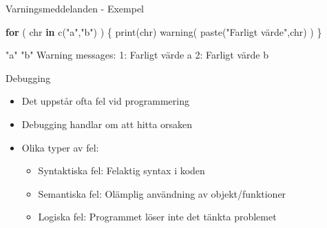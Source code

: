 \documentclass[
  11pt,
  ignorenonframetext,
]{beamer}
\newenvironment{Shaded}{\begin{snugshade}}{\end{snugshade}}
\newcommand{\ControlFlowTok}[1]{\textcolor[rgb]{0.13,0.29,0.53}{\textbf{#1}}}
\newcommand{\DecValTok}[1]{\textcolor[rgb]{0.00,0.00,0.81}{#1}}
\newcommand{\FunctionTok}[1]{\textcolor[rgb]{0.00,0.00,0.00}{#1}}
\newcommand{\NormalTok}[1]{#1}
\newcommand{\SpecialCharTok}[1]{\textcolor[rgb]{0.00,0.00,0.00}{#1}}
\newcommand{\StringTok}[1]{\textcolor[rgb]{0.31,0.60,0.02}{#1}}
\providecommand{\tightlist}{%
  \setlength{\itemsep}{0pt}\setlength{\parskip}{0pt}}
\begin{document}
\begin{frame}[fragile]{Varningsmeddelanden - Exempel}
\protect\hypertarget{varningsmeddelanden---exempel}{}
\begin{Shaded}
\begin{Highlighting}[]
\ControlFlowTok{for}\NormalTok{ ( chr }\ControlFlowTok{in} \FunctionTok{c}\NormalTok{(}\StringTok{"a"}\NormalTok{,}\StringTok{"b"}\NormalTok{) ) \{}
  \FunctionTok{print}\NormalTok{(chr)}
  \FunctionTok{warning}\NormalTok{( }\FunctionTok{paste}\NormalTok{(}\StringTok{"Farligt värde"}\NormalTok{,chr) )}
\NormalTok{\}}
\end{Highlighting}
\end{Shaded}

\pause

\begin{Shaded}
\begin{Highlighting}[]
\StringTok{"a"}
\StringTok{"b"}
\NormalTok{Warning messages}\SpecialCharTok{:}
\DecValTok{1}\SpecialCharTok{:}\NormalTok{ Farligt värde a }
\DecValTok{2}\SpecialCharTok{:}\NormalTok{ Farligt värde b }
\end{Highlighting}
\end{Shaded}
\end{frame}

\begin{frame}{Debugging}
\protect\hypertarget{debugging}{}
\begin{itemize}
\tightlist
\item
  Det uppstår ofta fel vid programmering
\item
  Debugging handlar om att hitta orsaken
\item
  Olika typer av fel:

  \begin{itemize}
  \tightlist
  \item
    Syntaktiska fel: Felaktig syntax i koden
  \item
    Semantiska fel: Olämplig användning av objekt/funktioner
  \item
    Logiska fel: Programmet löser inte det tänkta problemet
  \end{itemize}
\end{itemize}
\end{frame}
\end{document}
